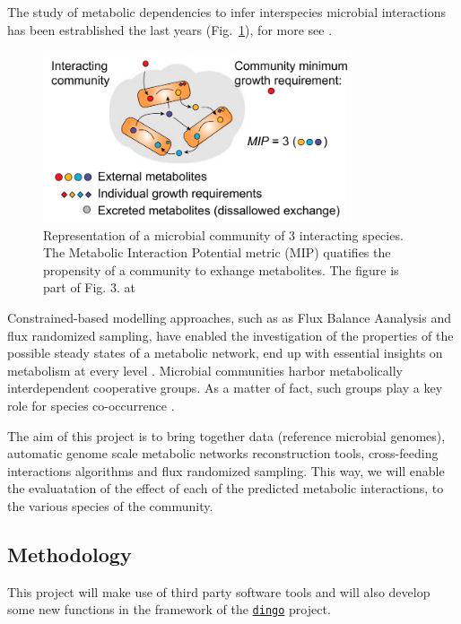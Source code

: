 \documentclass{article}
\begin{document}
The study of metabolic dependencies to infer interspecies microbial interactions has been estrablished the last years (Fig.~\ref{interacting_community}), for more see \cite{zelezniak2015metabolic}.


\begin{figure}[h]
\label{interacting_community}
   \centering
   \includegraphics[width=0.8\textwidth]{interacting_community.png}
   \caption{Representation of a microbial community of 3 interacting species. 
   The Metabolic Interaction Potential metric (MIP) quatifies the propensity of a community to exhange metabolites. The figure is part of Fig. 3. at \cite{zelezniak2015metabolic}}
\end{figure}


Constrained-based modelling approaches, such as as Flux Balance Aanalysis and flux randomized sampling, have enabled the investigation of the properties of the possible steady states of a metabolic network,
end up with essential insights on metabolism at every level \cite{muller2018using, vieira2019comparison}.
Microbial communities harbor metabolically interdependent cooperative groups.
As a matter of fact, such groups play a key role for species co-occurrence \cite{zelezniak2015metabolic}.


The aim of this project is to bring together 
data (reference microbial genomes), 
automatic genome scale metabolic networks reconstruction tools,
cross-feeding interactions algorithms 
and flux randomized sampling.
This way, we will enable the evaluatation of the 
effect of each of the predicted metabolic interactions, 
to the various species of the community. 


\subsection{Methodology}
\label{methodology}
This project will make use of third party software tools and will also develop 
some new functions in the framework of the 
\href{https://github.com/GeomScale/dingo/}{\texttt{dingo}} project. 
\end{document}
